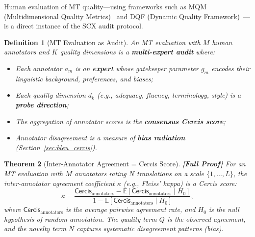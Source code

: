 \documentclass[12pt,a4paper]{article}
\newtheorem{theorem}{Theorem}[section]
\newtheorem{definition}[theorem]{Definition}
\theoremstyle{remark}
\newcommand{\E}{\mathbb{E}}
\newcommand{\SCX}{\textsf{SCX}}
\newcommand{\Cercis}{\textsf{Cercis}}
\newcommand{\rigorFull}{\textbf{[Full Proof]}}
\begin{document}
Human evaluation of MT quality---using frameworks such as MQM
(Multidimensional Quality Metrics)~\cite{lommel2014multidimensional}
and DQF (Dynamic Quality Framework)~\cite{castilho2017guide}---is
a direct instance of the \SCX{} audit protocol.

\begin{definition}[MT Evaluation as Audit]
\label{def:mt_audit}
An MT evaluation with $M$ human annotators and $K$ quality dimensions
is a \textbf{multi-expert audit} where:
\begin{itemize}[leftmargin=*]
  \item Each annotator $a_m$ is an \textbf{expert} whose gatekeeper
        parameter $g_m$ encodes their linguistic background, preferences,
        and biases;
  \item Each quality dimension $d_k$ (e.g., adequacy, fluency,
        terminology, style) is a \textbf{probe direction};
  \item The aggregation of annotator scores is the \textbf{consensus
        Cercis score};
  \item Annotator disagreement is a measure of \textbf{bias radiation}
        (Section~\ref{sec:bleu_cercis}).
\end{itemize}
\end{definition}

\begin{theorem}[Inter-Annotator Agreement = Cercis Score]
\label{thm:inter_annotator}
\rigorFull
For an MT evaluation with $M$ annotators rating $N$ translations
on a scale $\{1, \ldots, L\}$, the inter-annotator agreement
coefficient $\kappa$ (e.g., Fleiss' kappa) is a \Cercis{} score:
\begin{equation}
  \label{eq:kappa_cercis}
  \kappa = \frac{\Cercis_{\text{annotators}} - \E[\Cercis_{\text{annotators}} \mid H_0]}
    {1 - \E[\Cercis_{\text{annotators}} \mid H_0]},
\end{equation}
where $\Cercis_{\text{annotators}}$ is the average pairwise agreement
rate, and $H_0$ is the null hypothesis of random annotation. The
quality term $Q$ is the observed agreement, and the novelty term
$N$ captures systematic disagreement patterns (bias).
\end{theorem}
\end{document}
